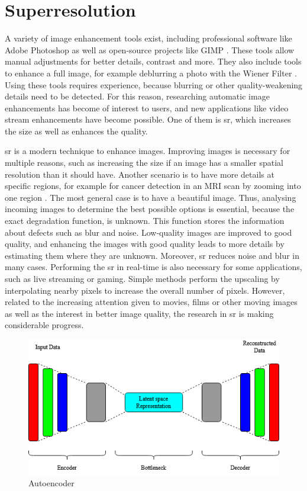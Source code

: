 \section{Superresolution}\label{section:background_superresolution}
A variety of image enhancement tools exist, including professional software like Adobe Photoshop \parencite{Adobe2020} as well as open-source projects like GIMP \parencite{Gimp2020}. These tools allow manual adjustments for better details, contrast and more. They also include tools to enhance a full image, for example deblurring a photo with the Wiener Filter \parencite{Wiener1964}. Using these tools requires experience, because blurring or other quality-weakening details need to be detected. For this reason, researching automatic image enhancements has become of interest to users, and new applications like video stream enhancements have become possible. One of them is \gls{sr}, which increases the size as well as enhances the quality.
\par
\Acrlong{sr} is a modern technique to enhance images. Improving images is necessary for multiple reasons, such as increasing the size if an image has a smaller spatial resolution than it should have. Another scenario is to have more details at specific regions, for example for cancer detection in an MRI scan by zooming into one region \parencite{Chaudhari2018}. The most general case is to have a beautiful image. Thus, analysing incoming images to determine the best possible options is essential, because the exact degradation function, is unknown. This function stores the information about defects such as blur and noise. Low-quality images are improved to good quality, and enhancing the images with good quality leads to more details by estimating them where they are unknown. Moreover, \gls{sr} reduces noise and blur in many cases. Performing the \gls{sr} in real-time is also necessary for some applications, such as live streaming or gaming. Simple methods perform the upscaling by interpolating nearby pixels to increase the overall number of pixels. However, related to the increasing attention given to movies, films or other moving images as well as the interest in better image quality, the research in \gls{sr} is making considerable progress.
\begin{figure}[htbp]
    \includegraphics[width=\textwidth,height=\textheight,keepaspectratio]{logos/Autoencoder.png}
     \caption{Autoencoder}
    \label{fig:autoencoder}
\end{figure}


